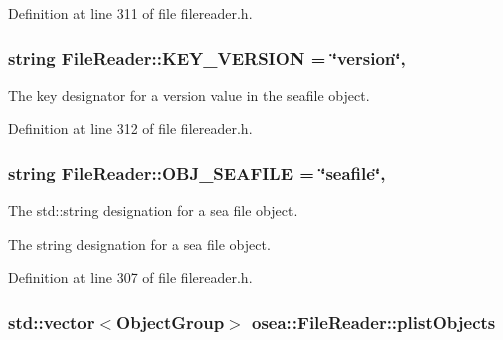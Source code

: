 Definition at line 311 of file filereader.\-h.

\hypertarget{classosea_1_1_file_reader_a81c228678c776f9094f24b4cea522e04}{
\subsubsection[{K\-E\-Y\-\_\-\-V\-E\-R\-S\-I\-O\-N}]{\setlength{\rightskip}{0pt plus 5cm}string File\-Reader\-::\-K\-E\-Y\-\_\-\-V\-E\-R\-S\-I\-O\-N = \char`\"{}version\char`\"{}\hspace{0.3cm}{\ttfamily [static]}, {\ttfamily [protected]}}}\label{classosea_1_1_file_reader_a81c228678c776f9094f24b4cea522e04}
The key designator for a version value in the seafile object. 

Definition at line 312 of file filereader.\-h.

\hypertarget{classosea_1_1_file_reader_aaed6f9acbda3d7b4d9a58a5995fcc3ae}{
\subsubsection[{O\-B\-J\-\_\-\-S\-E\-A\-F\-I\-L\-E}]{\setlength{\rightskip}{0pt plus 5cm}string File\-Reader\-::\-O\-B\-J\-\_\-\-S\-E\-A\-F\-I\-L\-E = \char`\"{}seafile\char`\"{}\hspace{0.3cm}{\ttfamily [static]}, {\ttfamily [protected]}}}\label{classosea_1_1_file_reader_aaed6f9acbda3d7b4d9a58a5995fcc3ae}
The std\-::string designation for a sea file object.

The string designation for a sea file object. 

Definition at line 307 of file filereader.\-h.

\hypertarget{classosea_1_1_file_reader_a1b16c3fe97f09ef7bb15bd56b3831bf9}{
\subsubsection[{plist\-Objects}]{\setlength{\rightskip}{0pt plus 5cm}std\-::vector$<${\bf Object\-Group}$>$ osea\-::\-File\-Reader\-::plist\-Objects\hspace{0.3cm}{\ttfamily [protected]}}}\label{classosea_1_1_file_reader_a1b16c3fe97f09ef7bb15bd56b3831bf9}


